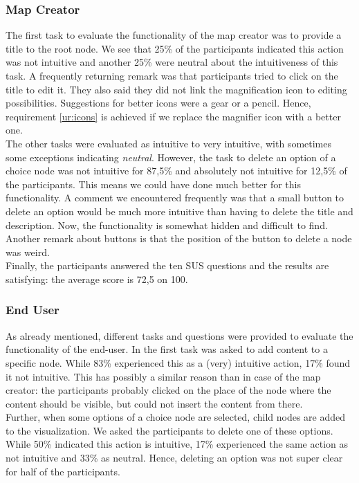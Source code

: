 \subsubsection{Map Creator}
The first task to evaluate the functionality of the map creator was to provide a title to the root node. We see that 25\% of the participants indicated this action was not intuitive and another 25\% were neutral about the intuitiveness of this task. A frequently returning remark was that participants tried to click on the title to edit it. They also said they did not link the magnification icon to editing possibilities. Suggestions for better icons were a gear or a pencil. Hence, requirement \ref{ur:icons} is achieved if we replace the magnifier icon with a better one.\\

The other tasks were evaluated as intuitive to very intuitive, with sometimes some exceptions indicating \textit{neutral}. However, the task to delete an option of a choice node was not intuitive for 87,5\% and absolutely not intuitive for 12,5\% of the participants. This means we could have done much better for this functionality. A comment we encountered frequently was that a small button to delete an option would be much more intuitive than having to delete the title and description. Now, the functionality is somewhat hidden and difficult to find. Another remark about buttons is that the position of the button to delete a node was weird.\\

Finally, the participants answered the ten SUS questions and the results are satisfying: the average score is 72,5 on 100. 

\subsubsection{End User}
As already mentioned, different tasks and questions were provided to evaluate the functionality of the end-user. In the first task was asked to add content to a specific node. While 83\% experienced this as a (very) intuitive action, 17\% found it not intuitive. This has possibly a similar reason than in case of the map creator: the participants probably clicked on the place of the node where the content should be visible, but could not insert the content from there.\\

Further, when some options of a choice node are selected, child nodes are added to the visualization. We asked the participants to delete one of these options. While 50\% indicated this action is intuitive, 17\% experienced the same action as not intuitive and 33\% as neutral. Hence, deleting an option was not super clear for half of the participants.\\

